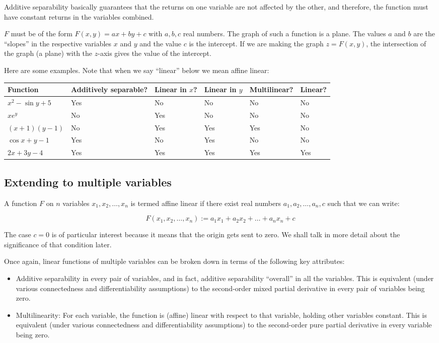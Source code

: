 \documentclass[10pt]{amsart}
\begin{document}
\begin{itemize}
  Additive separability basically guarantees that the returns on one
  variable are not affected by the other, and therefore, the function
  must have constant returns in the variables combined. 

  $F$ must be of the form $F(x,y) = ax + by + c$ with $a,b,c$
  real numbers. The graph of such a function is a plane. The values
  $a$ and $b$ are the ``slopes'' in the respective variables $x$ and
  $y$ and the value $c$ is the intercept. If we are making the graph
  $z = F(x,y)$, the intersection of the graph (a plane) with the
  $z$-axis gives the value of the intercept.
\end{itemize}

Here are some examples. Note that when we say ``linear'' below we mean
affine linear:

\begin{tabular}{|l|l|l|l|l|l|}
  \hline
  Function & Additively separable? & Linear in $x$? & Linear in $y$ & Multilinear? & Linear?\\\hline
  $x^2 - \sin y + 5$ & Yes & No & No & No & No \\\hline
  $xe^y$ & No & Yes & No & No & No\\\hline
  $(x + 1)(y - 1)$ & No & Yes & Yes & Yes & No \\\hline
  $\cos x + y - 1$ & Yes & No & Yes & No & No \\\hline
  $2x + 3y - 4$ & Yes & Yes & Yes & Yes & Yes \\\hline
\end{tabular}

\subsection{Extending to multiple variables}

A function $F$ on $n$ variables $x_1,x_2,\dots,x_n$ is termed affine
linear if there exist real numbers $a_1,a_2,\dots,a_n,c$ such that we can write:

$$F(x_1,x_2,\dots,x_n) := a_1x_1 + a_2x_2 + \dots + a_nx_n + c$$

The case $c = 0$ is of particular interest because it means that the
origin gets sent to zero. We shall talk in more detail about the
significance of that condition later.

Once again, linear functions of multiple variables can be broken down
in terms of the following key attributes:

\begin{itemize}
\item Additive separability in every pair of variables, and in fact,
  additive separability ``overall'' in all the variables. This is
  equivalent (under various connectedness and differentiability
  assumptions) to the second-order mixed partial derivative in every
  pair of variables being zero.
\item Multilinearity: For each variable, the function is (affine)
  linear with respect to that variable, holding other variables
  constant. This is equivalent (under various connectedness and
  differentiability assumptions) to the second-order pure partial
  derivative in every variable being zero.
\end{itemize}
\end{document}
